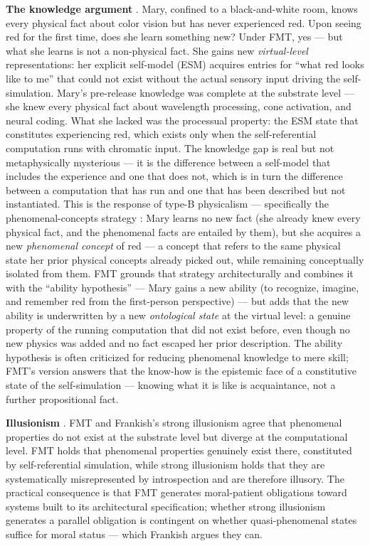 \documentclass[12pt]{article}
\begin{document}
{\textbf{The knowledge argument} \citep{Jackson1982}. Mary, confined to a black-and-white room, knows every physical fact about color vision but has never experienced red. Upon seeing red for the first time, does she learn something new? Under FMT, yes --- but what she learns is not a non-physical fact. She gains new \emph{virtual-level} representations: her explicit self-model (ESM) acquires entries for ``what red looks like to me'' that could not exist without the actual sensory input driving the self-simulation. Mary's pre-release knowledge was complete at the substrate level --- she knew every physical fact about wavelength processing, cone activation, and neural coding. What she lacked was the processual property: the ESM state that constitutes experiencing red, which exists only when the self-referential computation runs with chromatic input. The knowledge gap is real but not metaphysically mysterious --- it is the difference between a self-model that includes the experience and one that does not, which is in turn the difference between a computation that has run and one that has been described but not instantiated. This is the response of type-B physicalism --- specifically the phenomenal-concepts strategy \citep{Loar1997,Papineau2002}: Mary learns no new fact (she already knew every physical fact, and the phenomenal facts are entailed by them), but she acquires a new \emph{phenomenal concept} of red --- a concept that refers to the same physical state her prior physical concepts already picked out, while remaining conceptually isolated from them. FMT grounds that strategy architecturally and combines it with the ``ability hypothesis'' \citep{Lewis1988,Nemirow1990} --- Mary gains a new ability (to recognize, imagine, and remember red from the first-person perspective) --- but adds that the new ability is underwritten by a new \emph{ontological state} at the virtual level: a genuine property of the running computation that did not exist before, even though no new physics was added and no fact escaped her prior description. The ability hypothesis is often criticized for reducing phenomenal knowledge to mere skill; FMT's version answers that the know-how is the epistemic face of a constitutive state of the self-simulation --- knowing what it is like is acquaintance, not a further propositional fact.

\textbf{Illusionism} \citep{Frankish2016}. FMT and Frankish's strong illusionism agree that phenomenal properties do not exist at the substrate level but diverge at the computational level. FMT holds that phenomenal properties genuinely exist there, constituted by self-referential simulation, while strong illusionism holds that they are systematically misrepresented by introspection and are therefore illusory. The practical consequence is that FMT generates moral-patient obligations toward systems built to its architectural specification; whether strong illusionism generates a parallel obligation is contingent on whether quasi-phenomenal states suffice for moral status — which Frankish argues they can.

}
\end{document}
